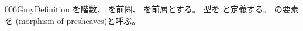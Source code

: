 \documentclass[index]{subfiles}
\begin{document}
\begin{myBlock}{006G}{myDefinition}
  を階数、
  を前圏、
  を前層とする。
  型を
  と定義する。
  の要素を
  (morphism of presheaves)と呼ぶ。
\end{myBlock}
\end{document}
